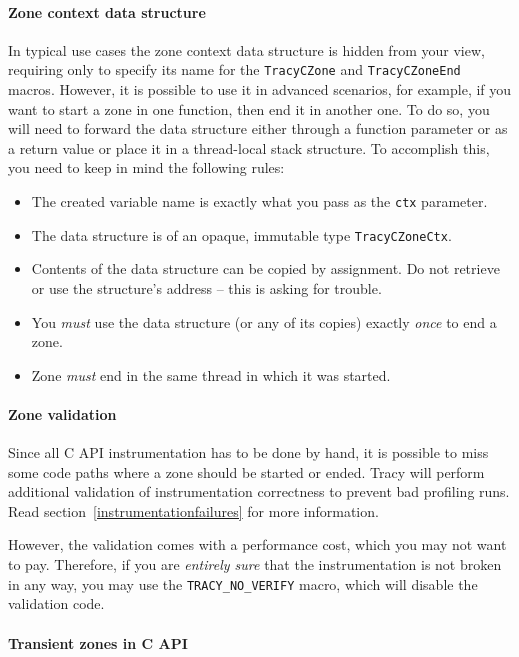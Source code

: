 \documentclass[hidelinks,titlepage,a4paper,twoside]{article}
\begin{document}
\paragraph{Zone context data structure}
\label{zonectx}

In typical use cases the zone context data structure is hidden from your view, requiring only to specify its name for the \texttt{TracyCZone} and \texttt{TracyCZoneEnd} macros. However, it is possible to use it in advanced scenarios, for example, if you want to start a zone in one function, then end it in another one. To do so, you will need to forward the data structure either through a function parameter or as a return value or place it in a thread-local stack structure. To accomplish this, you need to keep in mind the following rules:

\begin{itemize}
\item The created variable name is exactly what you pass as the \texttt{ctx} parameter.
\item The data structure is of an opaque, immutable type \texttt{TracyCZoneCtx}.
\item Contents of the data structure can be copied by assignment. Do not retrieve or use the structure's address -- this is asking for trouble.
\item You \emph{must} use the data structure (or any of its copies) exactly \emph{once} to end a zone.
\item Zone \emph{must} end in the same thread in which it was started.
\end{itemize}

\paragraph{Zone validation}

Since all C API instrumentation has to be done by hand, it is possible to miss some code paths where a zone should be started or ended. Tracy will perform additional validation of instrumentation correctness to prevent bad profiling runs. Read section~\ref{instrumentationfailures} for more information.

However, the validation comes with a performance cost, which you may not want to pay. Therefore, if you are \emph{entirely sure} that the instrumentation is not broken in any way, you may use the \texttt{TRACY\_NO\_VERIFY} macro, which will disable the validation code.

\paragraph{Transient zones in C API}
\end{document}
